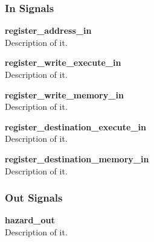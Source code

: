 
\subsubsection{In Signals}

\begin{description}
\item{\textbf{register\_address\_in}} \\
Description of it.
\item{\textbf{register\_write\_execute\_in}} \\
Description of it.
\item{\textbf{register\_write\_memory\_in}} \\
Description of it.
\item{\textbf{register\_destination\_execute\_in}} \\
Description of it.
\item{\textbf{register\_destination\_memory\_in}} \\
Description of it.
\end{description}

\subsubsection{Out Signals}

\begin{description}
\item{\textbf{hazard\_out}} \\
Description of it.
\end{description}
